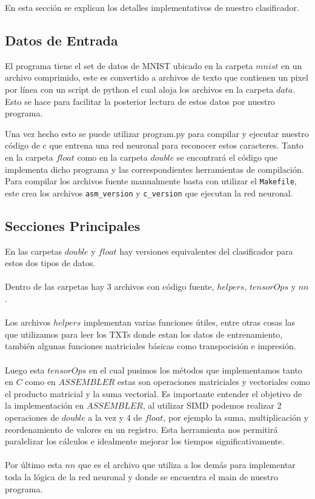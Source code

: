 
En esta sección se explican los detalles implementativos de nuestro clasificador.

\subsection{Datos de Entrada}

El programa tiene el set de datos de MNIST ubicado en la carpeta $mnist$ en un archivo comprimido, este es convertido a archivos de texto que contienen un pixel por línea con un script de python el cual aloja los archivos en la carpeta $data$. Esto se hace para facilitar la posterior lectura de estos datos por nuestro programa.

Una vez hecho esto se puede utilizar program.py para compilar y ejecutar nuestro código de c que entrena una red neuronal para reconocer estos caracteres. Tanto en la carpeta $float$ como en la carpeta $double$ se encontrará el código que implementa dicho programa y las correspondientes herramientas de compilación. Para compilar los archivos fuente manualmente basta con utilizar el \texttt{Makefile}, este crea los archivos \texttt{asm\_version} y \texttt{c\_version} que ejecutan la red neuronal.

\subsection{Secciones Principales}

En las carpetas $double$ y $float$ hay versiones equivalentes del clasificador para estos dos tipos de datos.
\\
\\
Dentro de las carpetas hay 3 archivos con código fuente, $helpers$, $tensorOps$ y $nn$.
\\
\\
Los archivos $helpers$ implementan varias funciones útiles, entre otras cosas las que utilizamos para leer los TXTs donde estan los datos de entrenamiento, también algunas funciones matriciales básicas como transpocisión e impresión.
\\
\\
Luego esta $tensorOps$ en el cual pusimos los métodos que implementamos tanto en $C$ como en $ASSEMBLER$ estas son operaciones matriciales y vectoriales como el producto matricial y la suma vectorial. Es importante entender el objetivo de la implementación en $ASSEMBLER$, al utilizar SIMD podemos realizar 2 operaciones de $double$ a la vez y 4 de $float$, por ejemplo la suma, multiplicación y reordenamiento de valores en un registro. Esta herramienta nos permitirá paralelizar los cálculos e idealmente mejorar los tiempos significativamente.
\\
\\
Por último esta $nn$ que es el archivo que utiliza a los demás para implementar toda la lógica de la red neuronal y donde se encuentra el main de nuestro programa.

